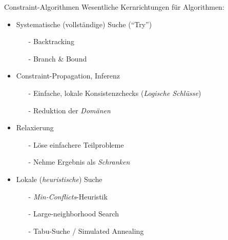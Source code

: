 \documentclass[10pt,xcolor={dvipsnames},fleqn]{beamer}
\begin{document}
\begin{frame}{Constraint-Algorithmen}
Wesentliche Kernrichtungen für Algorithmen:

\vspace*{2ex}

\begin{itemize}
\item \alert{Systematische} (vollständige) Suche (``\alert{Try}'')
\begin{itemize}
\item[-] Backtracking
\item[-] Branch \& Bound
\end{itemize} \pause

\vspace*{1ex}

\item Constraint-\alert{Propagation}, Inferenz
\begin{itemize}
\item[-] Einfache, lokale Konsistenzchecks (\emph{Logische Schlüsse})
\item[-] \alert{Reduktion} der \emph{Domänen}
\end{itemize} \pause

\vspace*{1ex}

\item \alert{Relaxierung}
\begin{itemize}
\item[-] Löse einfachere Teilprobleme
\item[-] Nehme Ergebnis als \emph{Schranken}
\end{itemize} \pause

\vspace*{1ex}

\item \alert{Lokale} (\emph{heuristische}) Suche
\begin{itemize}
\item[-] \emph{Min-Conflicts}-Heuristik
\item[-] Large-neighborhood Search
\item[-] Tabu-Suche / Simulated Annealing
\end{itemize}
\end{itemize}
\end{frame}
\end{document}
